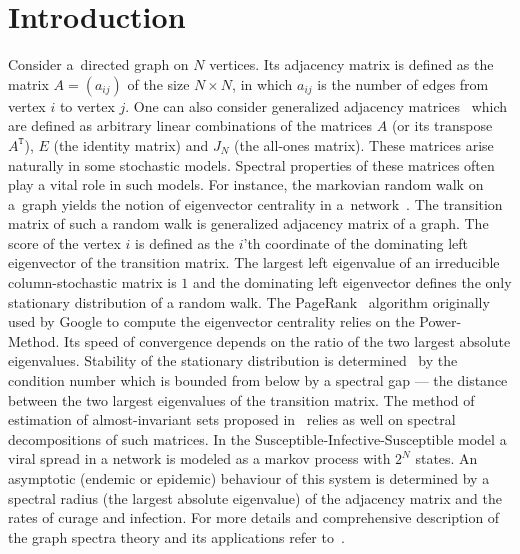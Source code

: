 \documentclass[a4paper]{jpconf}
\begin{document}
\section{Introduction}
Consider a~directed graph on \( N \) vertices.
Its adjacency matrix is defined as
    the matrix
    \( A = (a_{ij}) \)
    of the size \( N\times N \),
    in which \( a_{ij} \)
    is the number of edges
    from vertex \( i \)
    to vertex \( j \).
One can also consider generalized
    adjacency matrices~\cite{van2003graphs}
    which are defined as
    arbitrary linear combinations
    of the matrices \( A \) (or its transpose \( A^\mathtt{T} \)),
    \( E \) (the identity matrix)
    and \( J_N \) (the all-ones matrix).
These matrices arise naturally
    in some stochastic models.
Spectral  properties of these matrices
    often play a vital role in such models.
For instance, the markovian random walk on a~graph
    yields the notion of eigenvector centrality
    in a~network~\cite{bonacich1972factoring}.
The transition matrix of such a random walk
    is generalized adjacency matrix of a graph.
The score of the vertex \( i \)
    is defined as the \( i \)'th coordinate
    of the dominating left eigenvector
    of the transition matrix.
The largest left eigenvalue of an irreducible column-stochastic matrix
    is \( 1 \) and the dominating left eigenvector
    defines the only stationary distribution
    of a random walk.
The PageRank~\cite{ilprints422} algorithm
    originally used by Google
    to compute the eigenvector centrality
    relies on the Power-Method.
Its speed of convergence depends on
    the ratio of the two largest absolute eigenvalues.
Stability of the stationary distribution
    is determined~\cite{meyer1994sensitivity}
    by the condition number
    which is bounded from below
    by a spectral gap --- the distance between
    the two largest eigenvalues
    of the transition matrix.
The method of estimation of almost-invariant sets
    proposed in~\cite{schwartz2006fluctuation}
    relies as well on spectral decompositions of such matrices.
In the Susceptible-Infective-Susceptible model
    a viral spread in a network
    is modeled as a markov process
    with \( 2^N \) states.
An asymptotic (endemic or epidemic) behaviour of this system
    is determined by a spectral radius (the largest absolute eigenvalue)
    of the adjacency matrix
    and the rates of curage and infection.
For more details and comprehensive description
    of the graph spectra theory
    and its applications
    refer to~\cite{cvetkovic1980spectra,godsil2013algebraic}.
\end{document}
